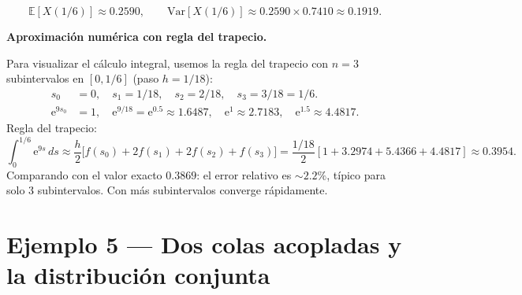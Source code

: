 \documentclass[11pt,a4paper]{article}
\theoremstyle{definition}
\theoremstyle{remark}
\newcommand{\E}{\mathbb{E}}
\newcommand{\Var}{\mathrm{Var}}
\newcommand{\e}{\mathrm{e}}
\begin{document}
\begin{ejemplo}
\[
  \E[X(1/6)] \approx 0.2590, \qquad
  \Var[X(1/6)] \approx 0.2590\times 0.7410 \approx 0.1919.
\]

\textbf{Aproximación numérica con regla del trapecio.}

Para visualizar el cálculo integral, usemos la regla del trapecio con
$n=3$ subintervalos en $[0,1/6]$ (paso $h=1/18$):
\begin{align*}
  s_0 &= 0,\quad s_1 = 1/18,\quad s_2 = 2/18,\quad s_3 = 3/18 = 1/6.\\
  \e^{9s_0} &= 1, \quad
  \e^{9/18} = \e^{0.5} \approx 1.6487, \quad
  \e^{1} \approx 2.7183, \quad
  \e^{1.5} \approx 4.4817.
\end{align*}
Regla del trapecio:
\[
  \int_0^{1/6}\e^{9s}\,ds \approx \frac{h}{2}
  \bigl[f(s_0) + 2f(s_1) + 2f(s_2) + f(s_3)\bigr]
  = \frac{1/18}{2}[1+3.2974+5.4366+4.4817]
  \approx 0.3954.
\]
Comparando con el valor exacto $0.3869$: el error relativo es
$\sim 2.2\%$, típico para solo 3 subintervalos.  Con más subintervalos
converge rápidamente.
\end{ejemplo}

\section{Ejemplo 5 --- Dos colas acopladas y la distribución conjunta}
\end{document}
